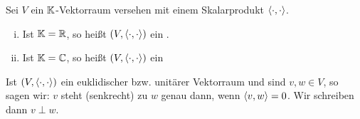 \begin{definition}
	\label{def:3.10}
	Sei $V$ ein $\mathbb{K}$-Vektorraum versehen mit einem Skalarprodukt $\left\langle\cdot,\cdot\right\rangle$.
	\begin{enumerate}[(i)]
		\item Ist $\mathbb{K}= \mathbb{R}$, so heißt $(V,\left\langle\cdot,\cdot\right\rangle)$ ein .
		\item Ist $\mathbb{K} = \mathbb{C}$, so heißt $(V,\left\langle\cdot,\cdot\right\rangle)$ ein 
	\end{enumerate}
	Ist $(V,\left\langle\cdot,\cdot\right\rangle)$ ein euklidischer bzw. unitärer Vektorraum und sind $v,w \in V$, so sagen wir:
	$v$ steht  (senkrecht) zu $w$ genau dann, wenn $\left\langle v,w\right\rangle = 0$.
	Wir schreiben dann $v \perp w$.
\end{definition}

